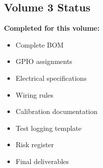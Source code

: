 \subsection{Volume 3 Status}
\label{sec:volume3-status}

\begin{validationbox}
\textbf{Completed for this volume:}
\begin{itemize}
    \item Complete BOM
    \item GPIO assignments
    \item Electrical specifications
    \item Wiring rules
    \item Calibration documentation
    \item Test logging template
    \item Risk register
    \item Final deliverables
\end{itemize}
\end{validationbox}
